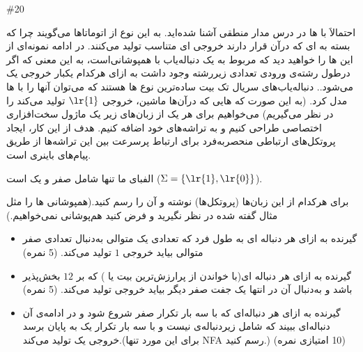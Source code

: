 \documentclass[../HW.tex]{subfiles}
\begin{document}
\question#{20}


احتمالاَ با ها در درس مدار منطقی آشنا شده‌اید. به این نوع از اتوماتا‌ها  می‌گویند چرا که بسته به ای که درآن قرار دارند خروجی ای متناسب تولید می‌کنند. در ادامه نمونه‌ای از این ها را خواهید دید که مربوط به یک دنباله‌یاب  با همپوشانی‌است، به این معنی که اگر درطول رشته‌ی ورودی تعدادی زیررشته  وجود داشت به ازای هرکدام یکبار خروجی یک می‌شود.. دنباله‌یاب‌های سریال تک بیت  ساده‌ترین نوع ها هستند که می‌توان آنها را با  ها مدل کرد. (به این صورت که هایی که درآن‌ها ماشین، خروجی $\text{\lr{1}}$ تولید می‌کند را  در نظر می‌گیریم) می‌خواهیم برای هر یک از زبان‌های زیر یک ماژول سخت‌افزاری اختصاصی طراحی کنیم و به تراشه‌های خود اضافه کنیم. هدف از این کار، ایجاد پروتکل‌های ارتباطی منحصربه‌فرد برای ارتباط پرسرعت بین این تراشه‌ها از طریق پیام‌های باینری است.

الفبای ما تنها شامل صفر و یک است ($\Sigma = \{\text{\lr{1}},\text{\lr{0}}\}$).

برای هرکدام از این زبان‌ها (پروتکل‌ها)   نوشته و  آن را رسم کنید.(همپوشانی ها را مثل مثال گفته شده در نظر نگیرید و فرض کنید هم‌پوشانی نمی‌خواهیم.)

\begin{itemize}

    \item[\textbf{(a}]
          گیرنده به ازای هر دنباله‌ ای به طول فرد که تعدادی یک  متوالی به‌دنبال تعدادی صفر  متوالی بیاید خروجی $1$ تولید می‌کند. (5 نمره)

    \item[\textbf{(b}]
          گیرنده به ازای هر دنباله‌ ای(با خواندن از پرارزش‌ترین بیت یا ) که بر $12$ بخش‌پذیر باشد و به‌دنبال آن در انتها یک جفت صفر  دیگر بیاید خروجی  تولید می‌کند. (5 نمره)

    \item[\textbf{(c}]
          گیرنده به ازای هر دنباله‌ای که با سه بار تکرار صفر  شروع شود و در ادامه‌ی آن دنباله‌ای ببیند که شامل زیردنباله‌ی  نیست و با سه بار تکرار یک  به پایان برسد خروجی یک تولید می‌کند.(برای این مورد تنها NFA رسم کنید.) (10 امتیازی نمره)

\end{itemize}
\end{document}
